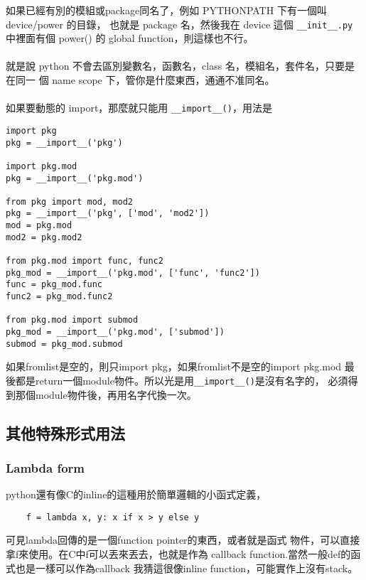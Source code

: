 如果已經有別的模組或package同名了，例如 PYTHONPATH 下有一個叫 device/power 
的目錄， 也就是 package 名，然後我在 device 這個 \verb=__init__.py= 中裡面有個
power() 的 global function，則這樣也不行。
\\\\
就是說 python 不會去區別變數名，函數名，class 名，模組名，套件名，只要是在同一
個 name scope 下，管你是什麼東西，通通不准同名。
\\\\
如果要動態的 import，那麼就只能用 \verb=__import__()=，用法是
\begin{verbatim}
import pkg
pkg = __import__('pkg')

import pkg.mod
pkg = __import__('pkg.mod')

from pkg import mod, mod2
pkg = __import__('pkg', ['mod', 'mod2'])
mod = pkg.mod
mod2 = pkg.mod2

from pkg.mod import func, func2
pkg_mod = __import__('pkg.mod', ['func', 'func2'])
func = pkg_mod.func
func2 = pkg_mod.func2

from pkg.mod import submod
pkg_mod = __import__('pkg.mod', ['submod'])
submod = pkg_mod.submod
\end{verbatim}
如果fromlist是空的，則只import pkg，如果fromlist不是空的import pkg.mod
最後都是return一個module物件。所以光是用\verb=__import__()=是沒有名字的，
必須得到那個module物件後，再用名字代換一次。

  \subsection{其他特殊形式用法}
    \subsubsection{Lambda form}
    python還有像C的inline的這種用於簡單邏輯的小函式定義，
    \begin{verbatim}
    f = lambda x, y: x if x > y else y
    \end{verbatim}

    可見lambda回傳的是一個function pointer的東西，或者就是函式
    物件，可以直接拿f來使用。在C中f可以丟來丟去，也就是作為
    callback function.當然一般def的函式也是一樣可以作為callback
    我猜這很像inline function，可能實作上沒有stack。
    \\\\

